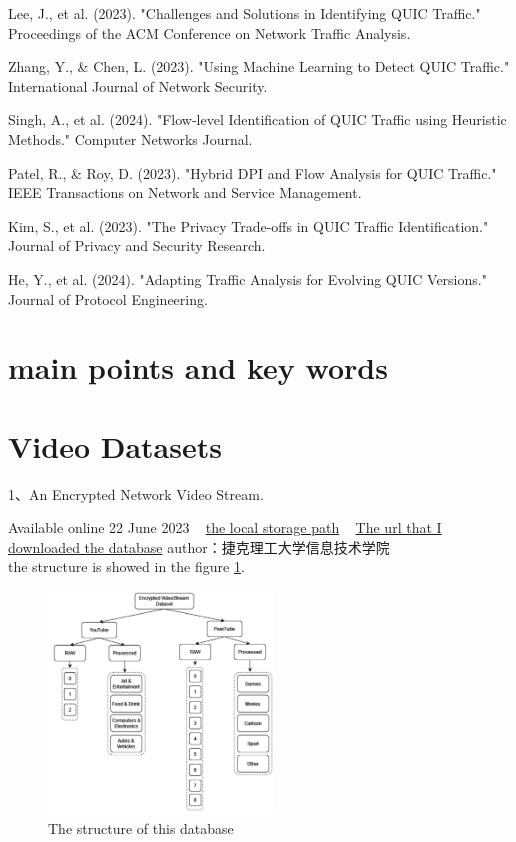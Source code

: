 \documentclass[a4paper, 10pt]{article}
\begin{document}
Lee, J., et al. (2023). "Challenges and Solutions in Identifying QUIC Traffic." Proceedings of the ACM Conference on Network Traffic Analysis.

Zhang, Y., \& Chen, L. (2023). "Using Machine Learning to Detect QUIC Traffic." International Journal of Network Security.

Singh, A., et al. (2024). "Flow-level Identification of QUIC Traffic using Heuristic Methods." Computer Networks Journal.

Patel, R., \& Roy, D. (2023). "Hybrid DPI and Flow Analysis for QUIC Traffic." IEEE Transactions on Network and Service Management.

Kim, S., et al. (2023). "The Privacy Trade-offs in QUIC Traffic Identification." Journal of Privacy and Security Research.

He, Y., et al. (2024). "Adapting Traffic Analysis for Evolving QUIC Versions." Journal of Protocol Engineering.

\section*{main points and key words}




\section{Video Datasets}

1、An Encrypted Network Video Stream.

Available online 22 June 2023 	~
\href{file://media/kl/7c5ed3c9-49bd-46de-bbdd-976fbc893c6d/database/envsds}{the local storage path} ~
\href{https://zenodo.org/records/8039729/files/envsds.zip?download=1}{The url that I downloaded the database}
author：捷克理工大学信息技术学院\\
the structure is showed in the figure \ref{fig:database1}.

\begin{figure}[ht]
	\centering
	\begin{minipage}{0.5\textwidth}%
		\includegraphics[width=6cm]{database1.jpg}
		\caption{The structure of this database}
		\label{fig:database1}
	\end{minipage}
\end{figure}
\end{document}
